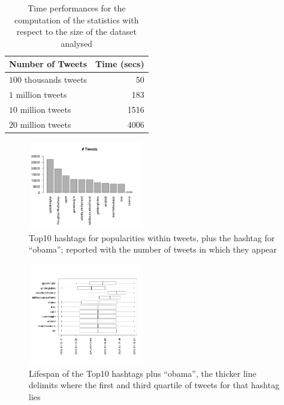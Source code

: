 \begin{table}[htb]
\centering 
\begin{tabular}{|l|r|}
\hline		
Number of Tweets			& Time (secs)\\
\hline
$100$ thousands tweets		&	50\\
$1$ million tweets		& 183\\
$10$ million tweets 		& 1516\\
$20$ million tweets 		& 4006\\  
\hline
\end{tabular}
\caption{Time performances for the computation of the statistics with respect to the size of the dataset analysed}
\label{tbl:times}
\end{table}

\begin{figure}[!ht]
\includegraphics[width=0.45\textwidth]{images/hashtag-tweets-hist_20.png} 
\caption{Top10 hashtags for popularities within tweets, plus the hashtag for ``obama''; reported with the number of tweets in which they appear}
\label{fig:tweets-hist}
\end{figure}

\begin{figure}[!hb]
\includegraphics[width=0.45\textwidth]{images/hashtags-timewindow.png} 
\caption{Lifespan of the Top10 hashtags plus ``obama'', the thicker line delimits where the first and third quartile of tweets for that hashtag lies}
\label{fig:tweets-lifespan}
\end{figure}

